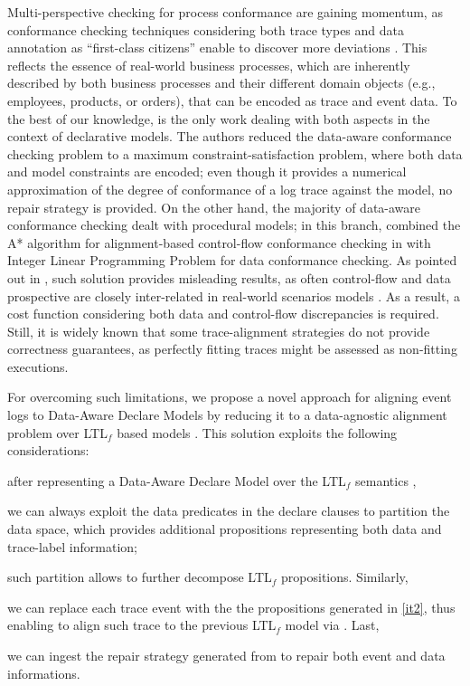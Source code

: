 Multi-perspective checking for process conformance are gaining momentum, as conformance checking techniques considering both trace types and data annotation as ``first-class citizens'' enable to discover more deviations \cite{MultiPerspective}. This reflects the essence of real-world business processes, which are inherently described by both business processes and their different domain objects \cite{PetermannJMR14} (e.g., employees, products, or orders), that can be encoded as trace and event data. To the best of our knowledge, \cite{Borrego014} is the only work dealing with both aspects in the context of declarative models. The authors reduced the data-aware conformance checking problem to a maximum constraint-satisfaction problem, where both data and model constraints are encoded; even though it provides a numerical approximation of the degree of conformance of a log trace against the model, no repair strategy is provided. On the other hand, the majority of  data-aware conformance checking dealt with procedural models; in this branch, \cite{LeoniA13} combined the A* algorithm for alignment-based control-flow conformance checking in \cite{LeoniMA12} with Integer Linear Programming Problem for data conformance checking. As pointed out in \cite{MultiPerspective}, such solution provides misleading results, as often control-flow and data prospective are closely inter-related in real-world scenarios models \cite{PetermannJMR14}. As a result, a cost function considering both data and control-flow discrepancies is required. Still, it is widely known \cite{AdriansyahDA10} that some trace-alignment strategies do not provide correctness guarantees, as perfectly fitting traces might be assessed as non-fitting executions. 

For overcoming such limitations, we propose a novel approach for aligning event logs to Data-Aware Declare Models by reducing it to a data-agnostic alignment problem over LTL$_f$ based models \cite{XuLZ17a}. This solution exploits the following considerations: \begin{enumerate*}[label=\emph{\alph*})]
	\item after representing a Data-Aware Declare Model over the LTL$_f$ semantics \cite{10.1007/978-3-642-40176-3_8}, 
	\item \label{it2} we can always exploit the data predicates in the declare clauses to partition the data space, which provides additional propositions representing both data and trace-label information;
	\item such partition allows to further decompose  LTL$_f$ propositions. Similarly,
	\item we can replace each trace event with the the propositions generated in \ref{it2}, thus enabling to align such trace to the previous LTL$_f$ model via \cite{XuLZ17a}. Last,
	\item we can ingest the repair strategy generated from \cite{XuLZ17a} to repair both event and data informations.
\end{enumerate*}

